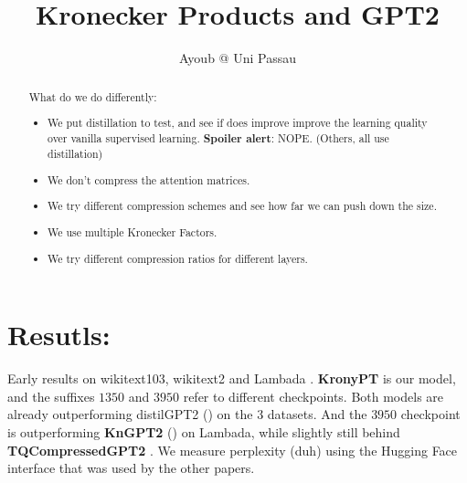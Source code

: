 \documentclass{article}
\title{Kronecker Products and GPT2}
\author{Ayoub @ Uni Passau}
\begin{document}
\maketitle

\begin{abstract}

What do we do differently:

\begin{itemize}
	\item We put distillation to test, and see if does improve improve the learning quality over vanilla supervised learning. \textbf{Spoiler alert}: NOPE. (Others, all use distillation)
	\item We don't compress the attention matrices.
	\item We try different compression schemes and see how far we can push down the size.
	\item We use multiple Kronecker Factors.
	\item We try different compression ratios for different layers.
\end{itemize}

\end{abstract}

\newpage

\tableofcontents
\newpage

\section{Resutls:}%
\label{sec:Resutls}

Early results on wikitext103, wikitext2 \cite{merity2016pointer} and Lambada \cite{paperno2016lambada}. \textbf{KronyPT} is our model, and the suffixes $1350$ and $3950$ refer to different checkpoints. Both models are already outperforming distilGPT2 (\cite{sanh2019distilbert}) on the 3 datasets. And the $3950$ checkpoint is outperforming \textbf{KnGPT2} (\cite{tahaei2022kroneckerbert}) on Lambada, while slightly still behind \textbf{TQCompressedGPT2}  \cite{abronin2024tqcompressor}. We measure perplexity (duh) using the Hugging Face interface that was used by the other papers.
\end{document}
